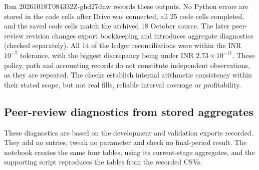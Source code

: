 \documentclass[11pt,a4paper]{article}
\begin{document}
Run 20261018T084332Z-ghd27dnw records these outputs. No Python errors are stored in the code cells after Drive was connected, all 25 code cells completed, and the saved code cells match the archived 18 October source. The later peer-review revision changes export bookkeeping and introduces aggregate diagnostics (checked separately). All 14 of the ledger reconciliations were within the INR $10^{-7}$ tolerance, with the biggest discrepancy being under INR $2.73\times10^{-11}$. These policy, path and accounting records do not constitute independent observations, as they are repeated. The checks establish internal arithmetic consistency within their stated scope, but not real fills, reliable interval coverage or profitability.


\subsection*{Peer-review diagnostics from stored aggregates}

These diagnostics are based on the development and validation exports recorded. They add no entries, tweak no parameter and check no final-period result. The notebook creates the same four tables, using its current-stage aggregates, and the supporting script reproduces the tables from the recorded CSVs.
\end{document}
